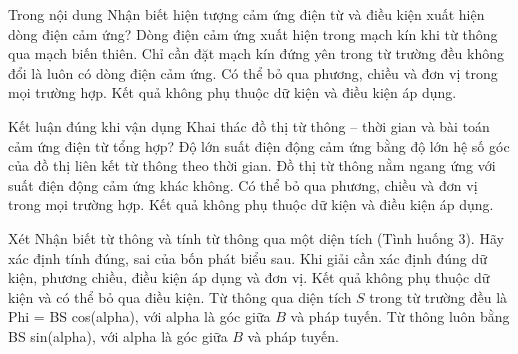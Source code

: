 \begin{ex}
Trong nội dung Nhận biết hiện tượng cảm ứng điện từ và điều kiện xuất hiện dòng điện cảm ứng?
\choice
{\True Dòng điện cảm ứng xuất hiện trong mạch kín khi từ thông qua mạch biến thiên.}
{Chỉ cần đặt mạch kín đứng yên trong từ trường đều không đổi là luôn có dòng điện cảm ứng.}
{Có thể bỏ qua phương, chiều và đơn vị trong mọi trường hợp.}
{Kết quả không phụ thuộc dữ kiện và điều kiện áp dụng.}
\end{ex}

\begin{ex}
Kết luận đúng khi vận dụng Khai thác đồ thị từ thông – thời gian và bài toán cảm ứng điện từ tổng hợp?
\choice
{\True Độ lớn suất điện động cảm ứng bằng độ lớn hệ số góc của đồ thị liên kết từ thông theo thời gian.}
{Đồ thị từ thông nằm ngang ứng với suất điện động cảm ứng khác không.}
{Có thể bỏ qua phương, chiều và đơn vị trong mọi trường hợp.}
{Kết quả không phụ thuộc dữ kiện và điều kiện áp dụng.}
\end{ex}

\begin{ex}
Xét Nhận biết từ thông và tính từ thông qua một diện tích (Tình huống 3). Hãy xác định tính đúng, sai của bốn phát biểu sau.
\choiceTF
{\True Khi giải cần xác định đúng dữ kiện, phương chiều, điều kiện áp dụng và đơn vị.}
{Kết quả không phụ thuộc dữ kiện và có thể bỏ qua điều kiện.}
{\True Từ thông qua diện tích $S$ trong từ trường đều là Phi = BS cos(alpha), với alpha là góc giữa $B$ và pháp tuyến.}
{Từ thông luôn bằng BS sin(alpha), với alpha là góc giữa $B$ và pháp tuyến.}
\end{ex}

